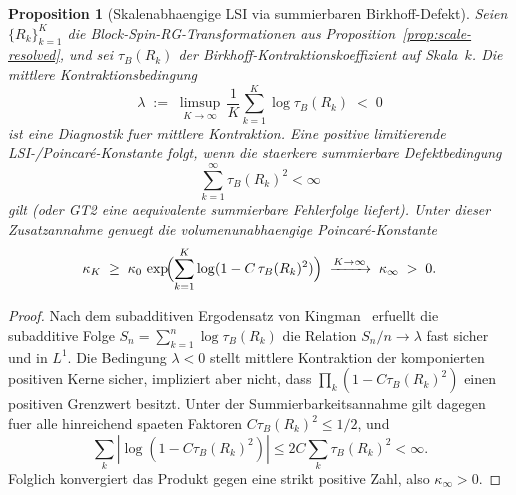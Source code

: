 \documentclass[12pt,a4paper]{article}
\theoremstyle{definition}
\theoremstyle{plain}
\newtheorem{proposition}[definition]{Proposition}
\theoremstyle{remark}
\begin{document}
\begin{proposition}[Skalenabhaengige LSI via summierbaren Birkhoff-Defekt]\label{prop:kingman-lsi}
Seien $\{R_k\}_{k=1}^K$ die Block-Spin-RG-Transformationen aus
Proposition~\ref{prop:scale-resolved}, und sei
$\tau_B(R_k)$ der Birkhoff-Kontraktionskoeffizient auf Skala~$k$.
Die mittlere Kontraktionsbedingung
\begin{equation}\label{eq:mean-contraction-lsi}
  \lambda \;:=\; \limsup_{K \to \infty}\,\frac{1}{K}\sum_{k=1}^{K}\log\tau_B(R_k) \;<\; 0
\end{equation}
ist eine Diagnostik fuer mittlere Kontraktion. Eine positive limitierende
LSI-/Poincar\'e-Konstante folgt, wenn die staerkere summierbare
Defektbedingung
\[
  \sum_{k=1}^\infty \tau_B(R_k)^2 < \infty
\]
gilt (oder GT2 eine aequivalente summierbare Fehlerfolge liefert). Unter
dieser Zusatzannahme genuegt die volumenunabhaengige Poincar\'e-Konstante
\[
  \kappa_K \;\geq\; \kappa_0\,\exp\!\Bigl(\sum_{k=1}^{K}\log(1 - C\,\tau_B(R_k)^2)\Bigr)
  \;\xrightarrow{K \to \infty}\; \kappa_\infty \;>\; 0 .
\]
\end{proposition}

\begin{proof}
Nach dem subadditiven Ergodensatz von Kingman~\cite{Kingman1968}
erfuellt die subadditive Folge $S_n = \sum_{k=1}^n \log\tau_B(R_k)$
die Relation $S_n/n \to \lambda$ fast sicher und in $L^1$.
Die Bedingung $\lambda < 0$ stellt mittlere Kontraktion der komponierten
positiven Kerne sicher, impliziert aber nicht, dass
$\prod_k(1-C\tau_B(R_k)^2)$ einen positiven Grenzwert besitzt. Unter der
Summierbarkeitsannahme gilt dagegen fuer alle hinreichend spaeten Faktoren
$C\tau_B(R_k)^2\leq 1/2$, und
\[
  \sum_k |\log(1-C\tau_B(R_k)^2)|
  \leq 2C\sum_k \tau_B(R_k)^2 < \infty .
\]
Folglich konvergiert das Produkt gegen eine strikt positive Zahl, also
$\kappa_\infty>0$.
\end{proof}
\end{document}

